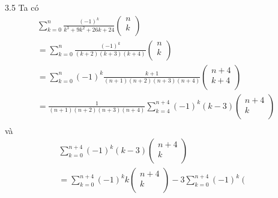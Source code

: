 \begin{Answer}{3.5}
 Ta có
\[
\begin{array}{l}
 \sum\limits_{k = 0}^n {\frac{{\left( { - 1} \right)^k }}{{k^3  + 9k^2  + 26k + 24}}} \left( \begin{array}{l}
 n \\
 k \\
 \end{array} \right) \\
  = \sum\limits_{k = 0}^n {\frac{{\left( { - 1} \right)^k }}{{\left( {k + 2} \right)\left( {k + 3} \right)\left( {k + 4} \right)}}} \left( \begin{array}{l}
 n \\
 k \\
 \end{array} \right) \\
  = \sum\limits_{k = 0}^n {\left( { - 1} \right)^k } \frac{{k + 1}}{{\left( {n + 1} \right)\left( {n + 2} \right)\left( {n + 3} \right)\left( {n + 4} \right)}}\left( \begin{array}{l}
 n + 4 \\
 k + 4 \\
 \end{array} \right) \\
  = \frac{1}{{\left( {n + 1} \right)\left( {n + 2} \right)\left( {n + 3} \right)\left( {n + 4} \right)}}\sum\limits_{k = 4}^{n + 4} {\left( { - 1} \right)^k \left( {k - 3} \right)} \left( \begin{array}{c}
 n + 4 \\
 k \\
 \end{array} \right) \\
 \end{array}
\]
và
\[
\begin{array}{l}
 \sum\limits_{k = 0}^{n + 4} {\left( { - 1} \right)^k } \left( {k - 3} \right)\left( \begin{array}{c}
 n + 4 \\
 k \\
 \end{array} \right) \\
  = \sum\limits_{k = 0}^{n + 4} {\left( { - 1} \right)^k k} \left( \begin{array}{c}
 n + 4 \\
 k \\
 \end{array} \right) - 3\sum\limits_{k = 0}^{n + 4} {\left( { - 1} \right)^k } \left( \begin{array}{c}

\end{array}
\end{array}\]
\end{Answer}
